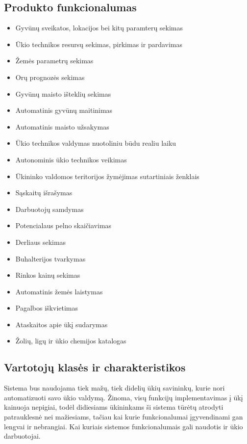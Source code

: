\documentclass[oneside]{VUMIFPSkursinis}
\begin{document}
\subsection{Produkto funkcionalumas}
\begin{itemize}
	\item Gyvūnų sveikatos, lokacijos bei kitų paramterų sekimas
	\item Ūkio technikos resursų sekimas, pirkimas ir pardavimas
	\item Žemės parametrų sekimas
	\item Orų prognozės sekimas
	\item Gyvūnų maisto išteklių sekimas
	\item Automatinis gyvūnų maitinimas
	\item Automatinis maisto užsakymas
	\item Ūkio technikos valdymas nuotoliniu būdu realiu laiku
	\item Autonominis ūkio technikos veikimas
	\item Ūkininko valdomos teritorijos žymėjimas sutartiniais ženklais
	\item Sąskaitų išrašymas
	\item Darbuotojų samdymas
	\item Potencialaus pelno skaičiavimas
	\item Derliaus sekimas
	\item Buhalterijos tvarkymas
	\item Rinkos kainų sekimas
	\item Automatinis žemės laistymas
	\item Pagalbos iškvietimas
	\item Ataskaitos apie ūkį sudarymas
	\item Žolių, ligų ir ūkio chemijos katalogas
\end{itemize}
\subsection{Vartotojų klasės ir charakteristikos}
Sistema bus naudojama tiek mažų, tiek didelių ūkių savininkų, kurie nori automatizuoti savo ūkio valdymą. Žinoma, visų funkcijų implementavimas į ūkį kainuoja nepigiai, todėl didiesiams ūkininkams ši sistema tūrėtų atrodyti patrauklesnė nei mažiesiams, tačiau kai kurie funkcionalumai įgyvendinami gan lengvai ir nebrangiai. Kai kuriais sistemos funkcionalumais gali naudotis ir ūkio darbuotojai.
\end{document}
